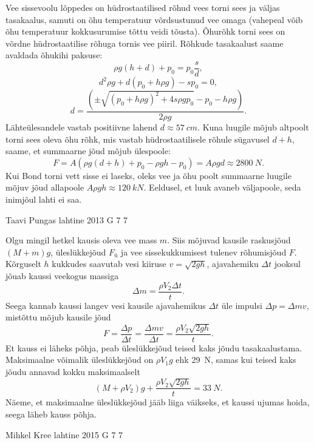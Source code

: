 \documentclass[11pt]{article}
\begin{document}
{{\ifSolution
Vee sissevoolu lõppedes on hüdrostaatilised rõhud vees torni sees ja väljas tasakaalus, samuti on õhu temperatuur võrdsustunud vee omaga (vahepeal võib õhu temperatuur kokkusurumise tõttu veidi tõusta). Õhurõhk torni sees on võrdne hüdrostaatilise rõhuga tornis vee piiril. Rõhkude tasakaalust saame avaldada õhukihi paksuse:
$$ \rho g (h+d) + p_0 = p_0 \frac{s}{d},$$
$$ d^2 \rho g + d (p_0 + h \rho g) - s p_0=0, $$
$$ d = \frac{( \pm \sqrt{(p_0 + h \rho g)^2 + 4 s \rho g p_0 } - p_0 - h \rho g)}{2\rho g }.$$
Lähteülesandele vastab positiivne lahend $d \approx \SI{57}{cm}$.
Kuna luugile mõjub altpoolt torni sees oleva õhu rõhk, mis vastab hüdrostaatilisele rõhule sügavusel $d+h$, saame, et summaarne jõud mõjub ülespoole:
$$F = A(\rho g (d+h) + p_0 - \rho g h - p_0) = A \rho g d \approx \SI{2800}{N}. $$ 
Kui Bond torni vett sisse ei laseks, oleks vee ja õhu poolt summaarne luugile mõjuv jõud allapoole $A \rho g h \approx \SI{120}{kN}$. Eeldusel, et luuk avaneb väljapoole, seda inimjõul lahti ei saa.
\fi
}

{Taavi Pungas} %
{lahtine} %
{2013} %
{G 7} %
{7} %
{

\ifSolution
Olgu mingil hetkel kausis oleva vee mass $m$. Siis mõjuvad kausile raskusjõud $(M+m)g$, üleslükkejõud $F_{ü}$ ja vee sissekukkumisest tulenev rõhumisjõud $F$. Kõrguselt $h$ kukkudes saavutab vesi kiiruse $v=\sqrt{2gh}$, ajavahemiku $\Delta t$ jooksul jõuab kaussi veekogus massiga
\[
\Delta m = \frac{\rho V_2 \Delta t}{t}.
\]
Seega kannab kaussi langev vesi kausile ajavahemikus $\Delta t$ üle impulsi $\Delta p =\Delta m v$, mistõttu mõjub kausile jõud
\[
F=\frac{\Delta p}{\Delta t}=\frac{\Delta m v}{\Delta t}=\frac{\rho V_2 \sqrt{2gh}}{t}.
\]
Et kauss ei läheks põhja, peab üleslükkejõud teised kaks jõudu tasakaalustama. Maksimaalne võimalik üleslükkejõud on $\rho V_1 g$ ehk \SI{29}{N}, samas kui teised kaks jõudu annavad kokku maksimaalselt
\[
(M+\rho V_2)g + \frac{\rho V_2 \sqrt{2gh}}{t} = \SI{33}{N}.
\]
Näeme, et maksimaalne üleslükkejõud jääb liiga väikseks, et kaussi ujumas hoida, seega läheb kauss põhja.
\fi
}

{Mihkel Kree} %
{lahtine} %
{2015} %
{G 7} %
{7} %
{

}}
\end{document}
